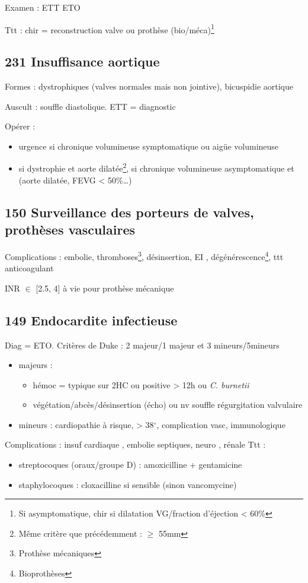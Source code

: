 \documentclass[11pt]{article}
\begin{document}
Examen : ETT \textpm{} ETO

Ttt : chir = reconstruction valve ou prothèse (bio/méca)\footnote{Si asymptomatique, chir si dilatation VG/fraction d'éjection < 60\%}
\subsection{231 Insuffisance aortique}
\label{sec:org89db126}
Formes : dystrophiques (valves normales mais non jointive), bicuspidie aortique

Auscult : souffle diastolique. ETT = diagnostic

Opérer :
\begin{itemize}
\item urgence si chronique volumineuse symptomatique ou aigüe volumineuse
\item si dystrophie et aorte dilatée\footnote{Même critère que précédemment : \(\ge\) 55mm}, si chronique volumineuse asymptomatique et (aorte
dilatée, FEVG < 50\%\ldots{})
\end{itemize}
\subsection{150 Surveillance des porteurs de valves, prothèses vasculaires}
\label{sec:org1523f4f}
Complications : embolie, thromboses\footnote{Prothèse mécaniques}, désinsertion, EI \faBomb,
dégénérescence\footnote{Bioprothèses}, ttt anticoagulant

INR \(\in\) [2.5, 4] à vie pour prothèse mécanique
\subsection{149 Endocardite infectieuse}
\label{sec:org11bc940}
Diag = ETO. Critères de Duke : 2 majeur/1 majeur et 3 mineurs/5mineurs
\begin{itemize}
\item majeurs : 
\begin{itemize}
\item hémoc = typique sur 2HC ou positive > 12h ou \emph{C. burnetii}
\item végétation/abcès/désinsertion (écho) ou nv souffle régurgitation valvulaire
\end{itemize}
\item mineurs : cardiopathie à risque, > 38\(^\circ\), complication vasc,
immunologique
\end{itemize}
Complications : insuf cardiaque \faBomb, embolie septiques, neuro , rénale
Ttt :
\begin{itemize}
\item streptocoques (oraux/groupe D) : amoxicilline + gentamicine
\item staphylocoques : cloxacilline si sensible (sinon vancomycine)
\end{itemize}
\end{document}
